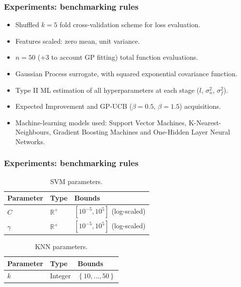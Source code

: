 \documentclass[10pt]{beamer}
\begin{document}
		\begin{frame}
		\frametitle{Experiments: benchmarking rules}
		\begin{itemize}
		\item Shuffled $k=5$ fold cross-validation scheme for loss evaluation.
		\item Features scaled: zero mean, unit variance.
		\item $n=50$ ($+3$ to account GP fitting) total function evaluations.
		\item Gaussian Process surrogate, with squared exponential covariance function.
		\item Type II ML estimation of all hyperparameters at each stage ($l$, $\sigma_n^2$, $\sigma_f^2$).
		\item Expected Improvement and GP-UCB ($\beta = 0.5$, $\beta = 1.5$) acquisitions.
		\item Machine-learning models used: Support Vector Machines, K-Nearest-Neighbours, Gradient Boosting 			Machines and One-Hidden Layer Neural Networks.
		\end{itemize}
		\end{frame}
		
		
		\begin{frame}
		\frametitle{Experiments: benchmarking rules}
		\begin{table}[]
		\centering
		\caption{SVM parameters.}
		\label{svmparam}
		\begin{tabular}{@{}lll@{}}
		\toprule
		\textbf{Parameter} & \textbf{Type}                      & \textbf{Bounds}               \\ \midrule
		$C$                & $\mathbb{R}^+$ & $\left[ 10^{-5}, 10^{5} \right]$ (log-scaled) \\
		$\gamma$           & $\mathbb{R}^+$ & $\left[10^{-5}, 10^{5} \right]$  (log-scaled)       \\ 					\bottomrule
		\end{tabular}
		\end{table}
		
		\begin{table}[]
		\centering
		\caption{KNN parameters.}
		\label{knnparams}
		\begin{tabular}{@{}lll@{}}
		\toprule
		\textbf{Parameter} & \textbf{Type} & \textbf{Bounds}                           \\ \midrule
		$k$                & Integer       & $\left\lbrace 10, \dots,50 \right\rbrace$
		\end{tabular}
		\end{table}
		\end{frame}
		
\end{document}
